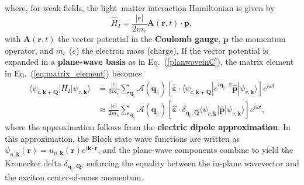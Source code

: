 where, for weak fields, the light--matter interaction Hamiltonian is given by~\cite{peng2022tailoring, sanchez2024enhanced}
\[
\hat{H}_I=\frac{|e|}{2m_e}\boldsymbol{A}(\boldsymbol{r}, t)\cdot\boldsymbol{p},
\]
with $\boldsymbol{A}(\boldsymbol{r}, t)$ the vector potential in the \textbf{Coulomb gauge}, $\boldsymbol{p}$ the momentum operator, and $m_e$ ($e$) the electron mass (charge).
If the vector potential is expanded in a \textbf{plane-wave basis} as in Eq.~(\ref{planwaveinC}), the matrix element in Eq.~(\ref{eq:matrix_element}) becomes
\begin{align}
\langle\psi_{c, \boldsymbol{k}+\boldsymbol{Q}}|H_I|\psi_{v, \boldsymbol{k}}\rangle
&= \frac{|e|}{2m_e} 
\sum_{\boldsymbol{q}_\parallel} 
\mathcal{A}(\boldsymbol{q}_\parallel) 
\left[
\hat{\boldsymbol{\varepsilon}} \cdot 
\langle\psi_{c, \boldsymbol{k}+\boldsymbol{Q}}|
e^{i\boldsymbol{q}_\parallel \cdot \boldsymbol{r}} 
\hat{\boldsymbol{p}} 
|\psi_{v, \boldsymbol{k}}\rangle
\right] e^{i\omega t} \nonumber \\
&\approx \frac{|e|}{2m_e} 
\sum_{\boldsymbol{q}_\parallel} 
\mathcal{A}(\boldsymbol{q}_\parallel) 
\left[
\hat{\boldsymbol{\varepsilon}} \cdot 
\delta_{\boldsymbol{q}_\parallel,\boldsymbol{Q}} 
\langle\psi_{c, \boldsymbol{k}}| 
\hat{\boldsymbol{p}} 
|\psi_{v, \boldsymbol{k}}\rangle
\right] e^{i\omega t},
\end{align}
where the approximation follows from the \textbf{electric dipole approximation}. In this approximation, the Bloch state wave functions are written as $\psi_{n, \boldsymbol{k}}(\boldsymbol{r})=u_{n, \boldsymbol{k}}(\boldsymbol{r}) e^{i\boldsymbol{k}\cdot \boldsymbol{r}}$, and the plane-wave components combine to yield the Kronecker delta $\delta_{\boldsymbol{q}_\parallel,\boldsymbol{Q}}$, enforcing the equality between the in-plane wavevector and the exciton center-of-mass momentum.

